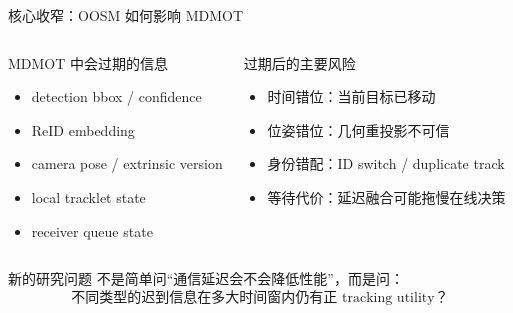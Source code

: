 \documentclass[aspectratio=169,xcolor=dvipsnames]{beamer}
\begin{document}
\begin{frame}{核心收窄：OOSM 如何影响 MDMOT}
\small
\begin{columns}[T,onlytextwidth]
  \begin{block}{MDMOT 中会过期的信息}
  \begin{itemize}
    \item detection bbox / confidence
    \item ReID embedding
    \item camera pose / extrinsic version
    \item local tracklet state
    \item receiver queue state
  \end{itemize}
  \end{block}

  \begin{block}{过期后的主要风险}
  \begin{itemize}
    \item 时间错位：当前目标已移动
    \item 位姿错位：几何重投影不可信
    \item 身份错配：ID switch / duplicate track
    \item 等待代价：延迟融合可能拖慢在线决策
  \end{itemize}
  \end{block}
\end{columns}

\begin{alertblock}{新的研究问题}
不是简单问“通信延迟会不会降低性能”，而是问：
\[
\text{不同类型的迟到信息在多大时间窗内仍有正 tracking utility？}
\]
\end{alertblock}
\end{frame}
\end{document}
